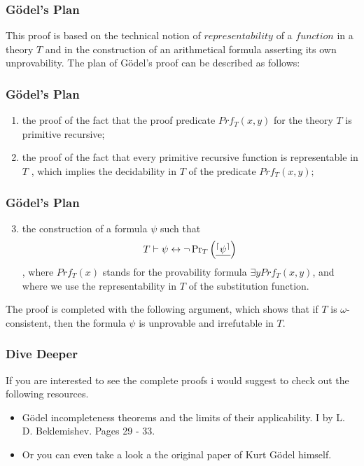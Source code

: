 \documentclass[aspectratio=169]{beamer}
\begin{document}
\begin{frame}
	\frametitle{Gödel's Plan}
	This proof is based on the technical notion of $representability$ of a $function$ in a theory $T$ and in the construction of an arithmetical formula asserting its own unprovability. The plan of Gödel's proof can be described as follows: \cite{bekl}
\end{frame}

\begin{frame}
	\frametitle{Gödel's Plan}
	\begin{enumerate}
		\item the proof of the fact that the proof predicate $Prf_T (x, y) $ for the theory $T$ is primitive recursive;
		\item the proof of the fact that every primitive recursive function is representable in $T$ , which implies the decidability in $T$ of the predicate $Prf_T (x, y);$
	\end{enumerate}
\end{frame}

\begin{frame}
	\frametitle{Gödel's Plan}
	\begin{enumerate}
	\setcounter{enumi}{2}
		\item the construction of a formula $\psi$ such that
		\[ T \vdash \psi \leftrightarrow \neg \operatorname{Pr}_{T}\left(\text{\underline{$^{\lceil} \psi^{\rceil}$}}\right) \]
		, where $Prf_T(x)$ stands for the provability formula $\exists y Prf_{T}(x, y)$, and where we
		use the representability in $T$ of the substitution function.
	\end{enumerate}
	The proof is completed with the following argument, which shows that if $T$ is $\omega$-consistent, then the formula $\psi$ is unprovable and irrefutable in $T$.
	\begin{flushright}
		\cite{bekl}
	\end{flushright}
\end{frame}

\begin{frame}
	\frametitle{Dive Deeper}
	If you are interested to see the complete proofs i would suggest to check out the following resources.
	\begin{itemize}
		\item Gödel incompleteness theorems and the limits of their applicability. I by L. D. Beklemishev. Pages 29 - 33. \cite{bekl}
		\item Or you can even take a look a the original paper of Kurt Gödel himself. \cite{godel}  
	\end{itemize}
\end{frame}
\end{document}
